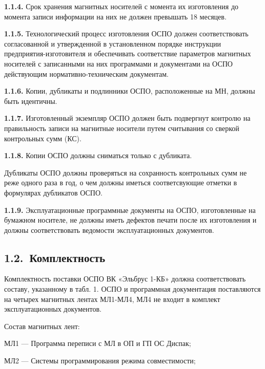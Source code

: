 \documentclass[11pt,a4paper]{article}
\begin{document}
\par\textbf{1.1.4.} Срок хранения магнитных носителей с момента их изготовления до момента записи информации на них не должен превышать 18 месяцев.\par
\par\textbf{1.1.5.} Технологический процесс изготовления ОСПО должен соответствовать согласованной и утвержденной в установленном порядке инструкции предприятия-изготовителя и обеспечивать соответствие параметров магнитных носителей с записанными на них программами и документами на ОСПО действующим нормативно-техническим документам.\par
\par\textbf{1.1.6.} Копии, дубликаты и подлинники ОСПО, расположенные на МН, должны быть идентичны.\par
\par\textbf{1.1.7.} Изготовленный экземпляр ОСПО должен быть подвергнут контролю на правильность записи на магнитные носители путем считывания со сверкой контрольных сумм (КС).\par
\par\textbf{1.1.8.} Копии ОСПО должны сниматься только с дубликата.\par
Дубликаты ОСПО должны проверяться на сохранность контрольных сумм не реже одного раза в год, о чем должны иметься соответсвующие отметки в формулярах дубликатов ОСПО.

\par\textbf{1.1.9.} Эксплуатационные программные документы на ОСПО, изготовленные на бумажном носителе, не должны иметь дефектов печати после их изготовления и должны соответствовать ведомости эксплуатационных документов.\par
\subsection*{1.2.~Комплектность}
Комплектность поставки ОСПО ВК «Эльбрус 1-КБ» должна соответствовать составу, указанному в табл. 1. ОСПО и программная документация поставляются на четырех магнитных лентах МЛ1-МЛ4, МЛ4 не входит в комплект эксплуатационных документов.

\begin{center}Состав магнитных лент:\end{center}
МЛ1 --- Программа переписи с МЛ в ОП и ГП ОС Диспак;

МЛ2 --- Системы программирования режима совместимости;
\end{document}
